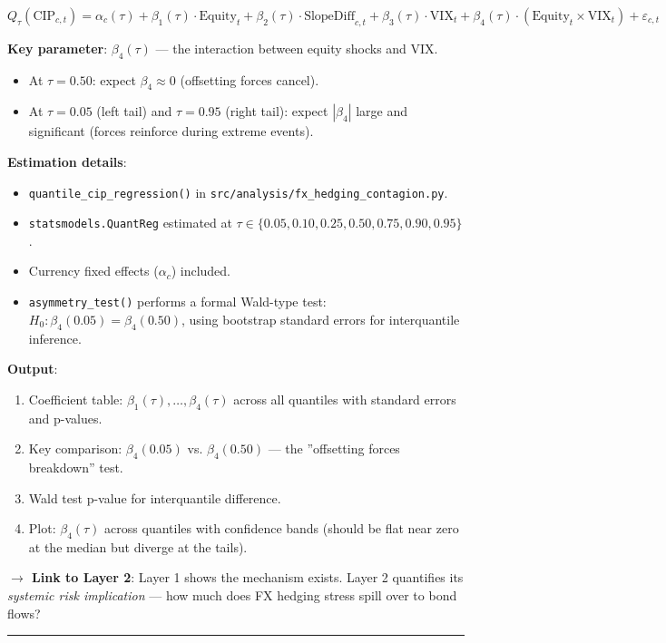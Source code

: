 \documentclass[11pt,a4paper]{article}
\begin{document}
\[Q_{\tau}(\text{CIP}_{c,t}) = \alpha_c(\tau) + \beta_1(\tau) \cdot \text{Equity}_t + \beta_2(\tau) \cdot \text{SlopeDiff}_{c,t} + \beta_3(\tau) \cdot \text{VIX}_t + \beta_4(\tau) \cdot (\text{Equity}_t \times \text{VIX}_t) + \varepsilon_{c,t}\]

\textbf{Key parameter}: $\beta_4(\tau)$ --- the interaction between equity shocks and VIX.
\begin{itemize}
\item At $\tau = 0.50$: expect $\beta_4 \approx 0$ (offsetting forces cancel).
\item At $\tau = 0.05$ (left tail) and $\tau = 0.95$ (right tail): expect $|\beta_4|$ large and significant (forces reinforce during extreme events).

\end{itemize}
\textbf{Estimation details}:
\begin{itemize}
\item \texttt{quantile\_cip\_regression()} in \texttt{src/analysis/fx\_hedging\_contagion.py}.
\item \texttt{statsmodels.QuantReg} estimated at $\tau \in \{0.05, 0.10, 0.25, 0.50, 0.75, 0.90, 0.95\}$.
\item Currency fixed effects ($\alpha_c$) included.
\item \texttt{asymmetry\_test()} performs a formal Wald-type test: $H_0: \beta_4(0.05) = \beta_4(0.50)$, using bootstrap standard errors for interquantile inference.

\end{itemize}
\textbf{Output}:
\begin{enumerate}
\item Coefficient table: $\beta_1(\tau), \ldots, \beta_4(\tau)$ across all quantiles with standard errors and p-values.
\item Key comparison: $\beta_4(0.05)$ vs. $\beta_4(0.50)$ --- the ''offsetting forces breakdown'' test.
\item Wald test p-value for interquantile difference.
\item Plot: $\beta_4(\tau)$ across quantiles with confidence bands (should be flat near zero at the median but diverge at the tails).

\end{enumerate}
\textbf{$\rightarrow$ Link to Layer 2}: Layer 1 shows the mechanism exists. Layer 2 quantifies its \textit{systemic risk implication} --- how much does FX hedging stress spill over to bond flows?


\bigskip\noindent\rule{\textwidth}{0.4pt}\bigskip
\end{document}
